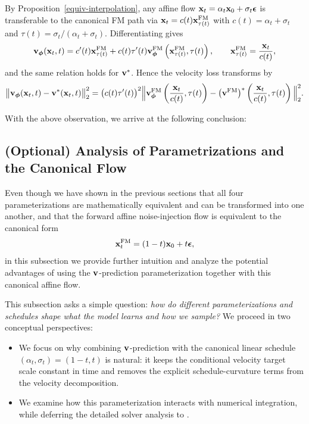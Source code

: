 By Proposition~\ref{equiv-interpolation}, any affine flow ${\mathbf{x}}_t=\alpha_t{\mathbf{x}}_0+\sigma_t{\bm{\epsilon}}$
is transferable to the canonical FM path via ${\mathbf{x}}_t=c(t){\mathbf{x}}^{\mathrm{FM}}_{\tau(t)}$ with
$c(t)=\alpha_t+\sigma_t$ and $\tau(t)=\sigma_t/(\alpha_t+\sigma_t)$. Differentiating gives
\[
{\mathbf{v}}_{{\bm{\phi}}}({\mathbf{x}}_t,t)=c'(t){\mathbf{x}}^{\mathrm{FM}}_{\tau(t)}
+c(t)\tau'(t){\mathbf{v}}^{\mathrm{FM}}_{{\bm{\phi}}} \left({\mathbf{x}}_{\tau(t)}^{\mathrm{FM}},\tau(t)\right),
\qquad
{\mathbf{x}}_{\tau(t)}^{\mathrm{FM}}=\frac{{\mathbf{x}}_t}{c(t)},
\]
and the same relation holds for ${\mathbf{v}}^*$. Hence the velocity loss transforms by
\begin{align*}
    \big\|{\mathbf{v}}_{{\bm{\phi}}}({\mathbf{x}}_t,t)-{\mathbf{v}}^*({\mathbf{x}}_t,t)\big\|_2^2
= \big(c(t) \tau'(t)\big)^2
\Big\|{\mathbf{v}}^{\mathrm{FM}}_{{\bm{\phi}}} \left(\frac{{\mathbf{x}}_t}{c(t)},\tau(t)\right)
-\big({\mathbf{v}}^{\mathrm{FM}}\big)^* \left(\frac{{\mathbf{x}}_t}{c(t)},\tau(t)\right)\Big\|_2^2.
\end{align*}

With the above observation, we arrive at the following conclusion:


\subsection{(Optional) Analysis of Parametrizations and the Canonical Flow}\label{subsec:concept-why-v-affine}
Even though we have shown in the previous sections that all four parameterizations are mathematically equivalent and can be transformed into one another, and that the forward affine noise-injection flow is equivalent to the canonical form
\[
{\mathbf{x}}_t^{\mathrm{FM}} = (1-t) {\mathbf{x}}_0 + t {\bm{\epsilon}},
\]
in this subsection we provide further intuition and analyze the potential advantages of using the ${\mathbf{v}}$-prediction parameterization together with this canonical affine flow.


This subsection asks a simple question: \emph{how do different parameterizations and schedules shape what the model learns and how we sample?} We proceed in two conceptual perspectives:
\begin{itemize}
    \item {}
    We focus on why combining ${\mathbf{v}}$-prediction with the canonical linear
    schedule $(\alpha_t,\sigma_t)=(1-t,t)$ is natural: it keeps the conditional
    velocity target scale constant in time and removes the explicit
    schedule-curvature terms from the velocity decomposition.
  \item {}
We examine how this parameterization interacts with numerical integration,
while deferring the detailed solver analysis to .
\end{itemize}

